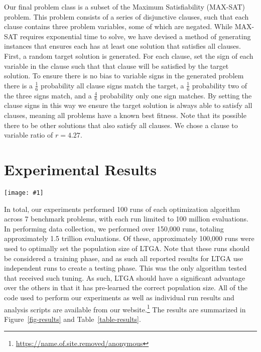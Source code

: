 \documentclass{sig-alternate}
\newcommand{\includegraphicswide}[1]
{\texttt{[image: \#1]}}
\begin{document}
Our final problem class is a subset of the Maximum Satisfiability (MAX-SAT) problem.
This problem consists of a series of disjunctive clauses, such that each clause contains
three problem variables, some of which are negated. While
MAX-SAT requires exponential time to solve, we have devised a method of generating
instances that ensures each has at least one solution that satisfies all clauses.
First, a random target solution is generated.  For each clause, set the sign of each
variable in the clause such that that clause will be satisfied by the target solution.
To ensure there is no bias to variable signs in the generated problem there is a $\frac{1}{6}$ probability
all clause signs match the target, a $\frac{1}{6}$ probability two of the three signs match,
and a $\frac{4}{6}$ probability only one sign matches.  By setting the clause signs
in this way we ensure the target solution is always able to satisfy all clauses,
meaning all problems have a known best fitness.  Note that its possible there to be
other solutions that also satisfy all clauses.  We chose a clause to variable ratio
of $r=4.27$.

\section{Experimental Results}
\begin{figure*}
  \centering
  \includegraphicswide{WithRast}
  \caption{Comparison of the median number of evaluations to reach the global optimum for
           the four different optimization methods on seven benchmark problems with respect
           to problem size.  If the median run did not reach the global optimum no point
           is drawn.  Results given on a log-log scale.}
  \label{fig-results}
\end{figure*}

In total, our experiments performed 100 runs of each optimization algorithm across
7 benchmark problems, with each run limited to 100 million evaluations.
In performing data collection, we performed over 150,000 runs, totaling approximately
1.5 trillion evaluations.  Of these, approximately 100,000 runs were used to optimally
set the population size of LTGA.  Note that these runs should be considered a training phase,
and as such all reported results for LTGA use independent runs to create a testing phase.
This was the only algorithm tested that received such tuning.  As such, LTGA should have a significant
advantage over the others in that it has pre-learned the correct population size.
All of the code used to perform our experiments
as well as individual run results and analysis scripts are available from our
website.\footnote{\url{https://name.of.site.removed/anonymous}}  The results
are summarized in Figure~\ref{fig-results} and Table~\ref{table-results}.
\end{document}
